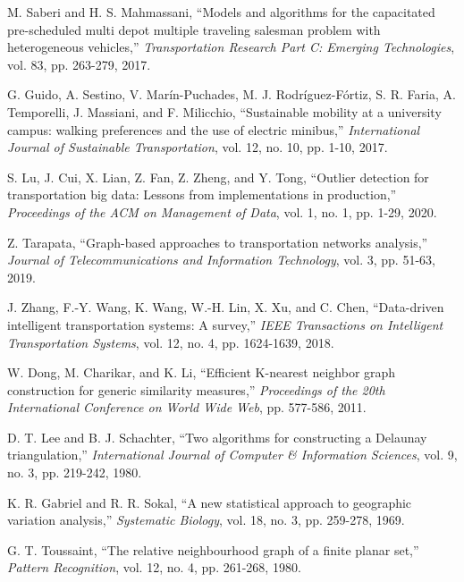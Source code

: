 \documentclass[12pt,twoside,a4paper,fleqn,bibliography=totocnumbered]{report}
\begin{document}
\begin{thebibliography}{1}
 M. Saberi and H. S. Mahmassani, ``Models and algorithms for the capacitated pre-scheduled multi depot multiple traveling salesman problem with heterogeneous vehicles,'' \emph{Transportation Research Part C: Emerging Technologies}, vol. 83, pp. 263-279, 2017.

 G. Guido, A. Sestino, V. Marín-Puchades, M. J. Rodríguez-Fórtiz, S. R. Faria, A. Temporelli, J. Massiani, and F. Milicchio, ``Sustainable mobility at a university campus: walking preferences and the use of electric minibus,'' \emph{International Journal of Sustainable Transportation}, vol. 12, no. 10, pp. 1-10, 2017.

 S. Lu, J. Cui, X. Lian, Z. Fan, Z. Zheng, and Y. Tong, ``Outlier detection for transportation big data: Lessons from implementations in production,'' \emph{Proceedings of the ACM on Management of Data}, vol. 1, no. 1, pp. 1-29, 2020.

 Z. Tarapata, ``Graph-based approaches to transportation networks analysis,'' \emph{Journal of Telecommunications and Information Technology}, vol. 3, pp. 51-63, 2019.

 J. Zhang, F.-Y. Wang, K. Wang, W.-H. Lin, X. Xu, and C. Chen, ``Data-driven intelligent transportation systems: A survey,'' \emph{IEEE Transactions on Intelligent Transportation Systems}, vol. 12, no. 4, pp. 1624-1639, 2018.

 W. Dong, M. Charikar, and K. Li, ``Efficient K-nearest neighbor graph construction for generic similarity measures,'' \emph{Proceedings of the 20th International Conference on World Wide Web}, pp. 577-586, 2011.

 D. T. Lee and B. J. Schachter, ``Two algorithms for constructing a Delaunay triangulation,'' \emph{International Journal of Computer & Information Sciences}, vol. 9, no. 3, pp. 219-242, 1980.

 K. R. Gabriel and R. R. Sokal, ``A new statistical approach to geographic variation analysis,'' \emph{Systematic Biology}, vol. 18, no. 3, pp. 259-278, 1969.

 G. T. Toussaint, ``The relative neighbourhood graph of a finite planar set,'' \emph{Pattern Recognition}, vol. 12, no. 4, pp. 261-268, 1980.


\end{thebibliography}
\end{document}
